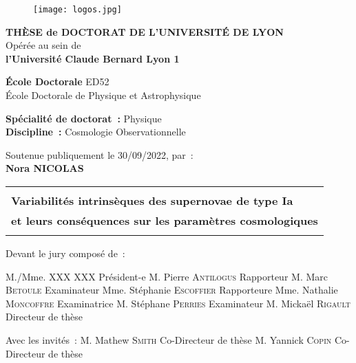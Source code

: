 \documentclass[../main/main.tex]{subfiles}
\begin{document}
\frontmatter

\begin{titlepage}
    \begin{center}
        \begin{figure}[h]
            \centering
            \texttt{[image: logos.jpg]}
        \end{figure}

        \vfill

        {\large\bfseries THÈSE de DOCTORAT DE L'UNIVERSITÉ DE LYON\\}
        {Opérée au sein de\\}
        {\large \bfseries l'Université Claude Bernard Lyon 1\\}
        \bigbreak

        {\large \textbf{École Doctorale} ED52\\
        École Doctorale de Physique et Astrophysique}
        \bigbreak

        {\large \textbf{Spécialité de doctorat~:} Physique \\}
        {\large \textbf{Discipline~:} Cosmologie Observationnelle}

        \vfill

        {Soutenue publiquement le 30/09/2022, par~:\\}
        {\Large\bfseries {Nora NICOLAS}\\}
        \vspace{0.5cm}
        \begin{adjustwidth}{-10pt}{-10pt}
        \begin{tabularx}{\linewidth}{Y}
            \toprule
            \\
            \Large \bfseries Variabilités intrinsèques des supernovae de type Ia\\
            \Large \bfseries et leurs conséquences sur les paramètres
            cosmologiques\\
            \\[-0.2em]
            \bottomrule
        \end{tabularx}
        \end{adjustwidth}

        \vfill

    \end{center}

\vfill

Devant le jury composé de~:\bigbreak

M./Mme. XXX XXX \hfill Président-e\smallbreak
M. Pierre \textsc{Antilogus} \hfill Rapporteur\smallbreak
M. Marc \textsc{Betoule} \hfill Examinateur\smallbreak
Mme. Stéphanie \textsc{Escoffier} \hfill Rapporteure\smallbreak
Mme. Nathalie \textsc{Moncoffre} \hfill Examinatrice\smallbreak
M. Stéphane \textsc{Perries} \hfill Examinateur\smallbreak
M. Mickaël \textsc{Rigault} \hfill Directeur de thèse\bigbreak

Avec les invités~:\bigbreak
M. Mathew \textsc{Smith} \hfill Co-Directeur de thèse\smallbreak
M. Yannick \textsc{Copin} \hfill Co-Directeur de thèse\smallbreak

\vfill

\end{titlepage}
\end{document}
